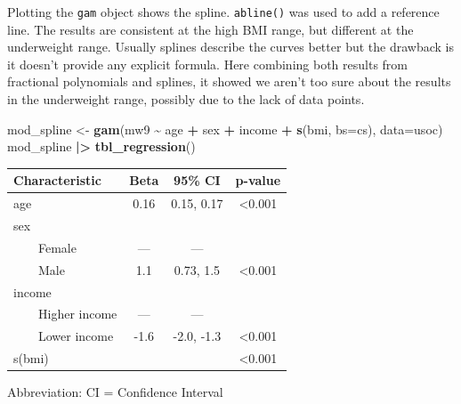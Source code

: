 \documentclass[
]{book}
\newenvironment{Shaded}{\begin{snugshade}}{\end{snugshade}}
\newcommand{\AttributeTok}[1]{\textcolor[rgb]{0.13,0.29,0.53}{#1}}
\newcommand{\FunctionTok}[1]{\textcolor[rgb]{0.13,0.29,0.53}{\textbf{#1}}}
\newcommand{\NormalTok}[1]{#1}
\newcommand{\OtherTok}[1]{\textcolor[rgb]{0.56,0.35,0.01}{#1}}
\newcommand{\SpecialCharTok}[1]{\textcolor[rgb]{0.81,0.36,0.00}{\textbf{#1}}}
\newcommand{\StringTok}[1]{\textcolor[rgb]{0.31,0.60,0.02}{#1}}
\begin{document}
Plotting the \texttt{gam} object shows the spline. \texttt{abline()} was used to add a reference line. The results are consistent at the high BMI range, but different at the underweight range. Usually splines describe the curves better but the drawback is it doesn't provide any explicit formula. Here combining both results from fractional polynomials and splines, it showed we aren't too sure about the results in the underweight range, possibly due to the lack of data points.

\begin{Shaded}
\begin{Highlighting}[]
\NormalTok{mod\_spline }\OtherTok{\textless{}{-}} \FunctionTok{gam}\NormalTok{(mw9 }\SpecialCharTok{\textasciitilde{}}\NormalTok{ age }\SpecialCharTok{+}\NormalTok{ sex }\SpecialCharTok{+}\NormalTok{ income }\SpecialCharTok{+} \FunctionTok{s}\NormalTok{(bmi, }\AttributeTok{bs=}\StringTok{\textquotesingle{}cs\textquotesingle{}}\NormalTok{), }\AttributeTok{data=}\NormalTok{usoc)}
\NormalTok{mod\_spline }\SpecialCharTok{|\textgreater{}} \FunctionTok{tbl\_regression}\NormalTok{()}
\end{Highlighting}
\end{Shaded}

\begin{table}[t]
\fontsize{12.0pt}{14.0pt}\selectfont
\begin{tabular*}{\linewidth}{@{\extracolsep{\fill}}lccc}
\toprule
\textbf{Characteristic} & \textbf{Beta} & \textbf{95\% CI} & \textbf{p-value} \\ 
\midrule\addlinespace[2.5pt]
age & 0.16 & 0.15, 0.17 & <0.001 \\ 
sex &  &  &  \\ 
    Female & — & — &  \\ 
    Male & 1.1 & 0.73, 1.5 & <0.001 \\ 
income &  &  &  \\ 
    Higher income & — & — &  \\ 
    Lower income & -1.6 & -2.0, -1.3 & <0.001 \\ 
s(bmi) &  &  & <0.001 \\ 
\bottomrule
\end{tabular*}
\begin{minipage}{\linewidth}
\vspace{.05em}
Abbreviation: CI = Confidence Interval\\
\end{minipage}
\end{table}
\end{document}

